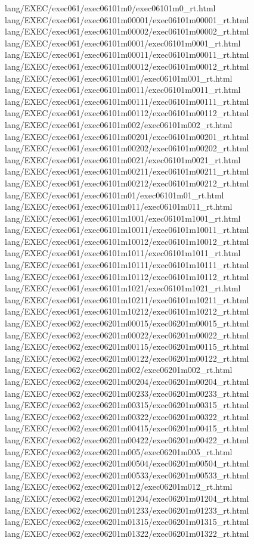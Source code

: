 lang/EXEC/exec061/exec06101m0/exec06101m0_rt.html
lang/EXEC/exec061/exec06101m00001/exec06101m00001_rt.html
lang/EXEC/exec061/exec06101m00002/exec06101m00002_rt.html
lang/EXEC/exec061/exec06101m0001/exec06101m0001_rt.html
lang/EXEC/exec061/exec06101m00011/exec06101m00011_rt.html
lang/EXEC/exec061/exec06101m00012/exec06101m00012_rt.html
lang/EXEC/exec061/exec06101m001/exec06101m001_rt.html
lang/EXEC/exec061/exec06101m0011/exec06101m0011_rt.html
lang/EXEC/exec061/exec06101m00111/exec06101m00111_rt.html
lang/EXEC/exec061/exec06101m00112/exec06101m00112_rt.html
lang/EXEC/exec061/exec06101m002/exec06101m002_rt.html
lang/EXEC/exec061/exec06101m00201/exec06101m00201_rt.html
lang/EXEC/exec061/exec06101m00202/exec06101m00202_rt.html
lang/EXEC/exec061/exec06101m0021/exec06101m0021_rt.html
lang/EXEC/exec061/exec06101m00211/exec06101m00211_rt.html
lang/EXEC/exec061/exec06101m00212/exec06101m00212_rt.html
lang/EXEC/exec061/exec06101m01/exec06101m01_rt.html
lang/EXEC/exec061/exec06101m011/exec06101m011_rt.html
lang/EXEC/exec061/exec06101m1001/exec06101m1001_rt.html
lang/EXEC/exec061/exec06101m10011/exec06101m10011_rt.html
lang/EXEC/exec061/exec06101m10012/exec06101m10012_rt.html
lang/EXEC/exec061/exec06101m1011/exec06101m1011_rt.html
lang/EXEC/exec061/exec06101m10111/exec06101m10111_rt.html
lang/EXEC/exec061/exec06101m10112/exec06101m10112_rt.html
lang/EXEC/exec061/exec06101m1021/exec06101m1021_rt.html
lang/EXEC/exec061/exec06101m10211/exec06101m10211_rt.html
lang/EXEC/exec061/exec06101m10212/exec06101m10212_rt.html
lang/EXEC/exec062/exec06201m00015/exec06201m00015_rt.html
lang/EXEC/exec062/exec06201m00022/exec06201m00022_rt.html
lang/EXEC/exec062/exec06201m00115/exec06201m00115_rt.html
lang/EXEC/exec062/exec06201m00122/exec06201m00122_rt.html
lang/EXEC/exec062/exec06201m002/exec06201m002_rt.html
lang/EXEC/exec062/exec06201m00204/exec06201m00204_rt.html
lang/EXEC/exec062/exec06201m00233/exec06201m00233_rt.html
lang/EXEC/exec062/exec06201m00315/exec06201m00315_rt.html
lang/EXEC/exec062/exec06201m00322/exec06201m00322_rt.html
lang/EXEC/exec062/exec06201m00415/exec06201m00415_rt.html
lang/EXEC/exec062/exec06201m00422/exec06201m00422_rt.html
lang/EXEC/exec062/exec06201m005/exec06201m005_rt.html
lang/EXEC/exec062/exec06201m00504/exec06201m00504_rt.html
lang/EXEC/exec062/exec06201m00533/exec06201m00533_rt.html
lang/EXEC/exec062/exec06201m012/exec06201m012_rt.html
lang/EXEC/exec062/exec06201m01204/exec06201m01204_rt.html
lang/EXEC/exec062/exec06201m01233/exec06201m01233_rt.html
lang/EXEC/exec062/exec06201m01315/exec06201m01315_rt.html
lang/EXEC/exec062/exec06201m01322/exec06201m01322_rt.html
